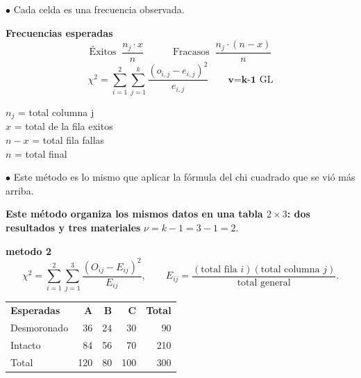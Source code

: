 \documentclass[10pt,a4paper]{article}
\begin{document}
$\bullet$ Cada celda es una frecuencia observada.

\begin{minipage}{0.55\textwidth}
\textbf{Frecuencias esperadas}
\[
\text{Éxitos } \ \frac{n_j\cdot x}{n}
\qquad\quad
\text{Fracasos } \ \frac{n_j\cdot (n-x)}{n}
\]
\[
\chi^2 = \sum_{i=1}^{2}\sum_{j=1}^{k} \frac{\left(o_{i,j} - e_{i,j}\right)^2}{e_{i,j}}
\qquad \textbf{v=k-1} \text{ GL}
\]
\end{minipage}\hfill
\begin{minipage}{0.40\textwidth}
{\small
$n_j$ = total columna j \\
$x$ = total de la fila exitos \\
$n-x$ = total fila fallas \\
$n$ = total final
}
\end{minipage}

$\bullet$ Este método es lo mismo que aplicar la fórmula del chi cuadrado que se vió más arriba.

\textbf{Este método organiza los mismos datos en una tabla $2\times 3$: dos resultados y tres materiales} \hfill $\nu = k-1 = 3-1 = 2.$

\textbf{metodo 2}
\[
\chi^2 = \sum_{i=1}^{2}\sum_{j=1}^{3} \frac{\left(O_{ij} - E_{ij}\right)^2}{E_{ij}},
\qquad
E_{ij} = \frac{(\text{total fila } i)(\text{total columna } j)}{\text{total general}}.
\]

\begin{center}
\vspace{-4pt}
\begin{tabular}{l r r r r}
\toprule
\rowcolor{cyan!10} \textbf{Esperadas} & \textbf{A} & \textbf{B} & \textbf{C} & \textbf{Total} \\
Desmoronado & 36 & 24 & 30 & 90 \\
Intacto & 84 & 56 & 70 & 210 \\
\midrule
Total & 120 & 80 & 100 & 300 \\
\bottomrule
\end{tabular}
\end{center}
\end{document}
